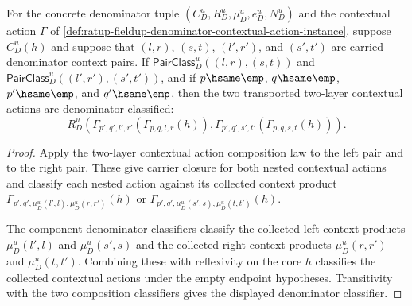 \begin{theorem}
\label{thm:rat-denom-unit-contextual-action-pair-classifier-transport}
For the concrete denominator tuple
$(C_D^u,R_D^u,\mu_D^u,e_D^u,N_D^u)$ and the contextual action $\Gamma$ of
\autoref{def:ratup-fieldup-denominator-contextual-action-instance}, suppose
$C_D^u(h)$ and suppose that $(l,r)$, $(s,t)$, $(l',r')$, and $(s',t')$ are
carried denominator context pairs. If
$\mathsf{PairClass}_D^u((l,r),(s,t))$ and
$\mathsf{PairClass}_D^u((l',r'),(s',t'))$, and if
$p\hsame\emp$, $q\hsame\emp$, $p'\hsame\emp$, and $q'\hsame\emp$, then the two
transported two-layer contextual actions are denominator-classified:
$$
R_D^u(\Gamma_{p',q',l',r'}(\Gamma_{p,q,l,r}(h)),
\Gamma_{p',q',s',t'}(\Gamma_{p,q,s,t}(h))).
$$
\end{theorem}
\begin{proof}
Apply the two-layer contextual action composition law to the left pair and to
the right pair. These give carrier closure for both nested contextual actions
and classify each nested action against its collected context product
$\Gamma_{p',q',\mu_D^u(l',l),\mu_D^u(r,r')}(h)$ or
$\Gamma_{p',q',\mu_D^u(s',s),\mu_D^u(t,t')}(h)$.

The component denominator classifiers classify the collected left context
products $\mu_D^u(l',l)$ and $\mu_D^u(s',s)$ and the collected right context
products $\mu_D^u(r,r')$ and $\mu_D^u(t,t')$. Combining these with reflexivity
on the core $h$ classifies the collected contextual actions under the empty
endpoint hypotheses. Transitivity with the two composition classifiers gives
the displayed denominator classifier.
\end{proof}

